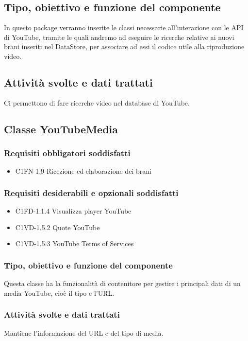 \subsection*{Tipo, obiettivo e funzione del componente}
In questo package verranno inserite le classi necessarie all'interazione con le
API di YouTube, tramite le quali andremo ad eseguire le ricerche relative ai
nuovi brani inseriti nel DataStore, per associare ad essi il codice utile alla
riproduzione video.
\subsection*{Attivit\`a svolte e dati trattati}
Ci permettono di fare ricerche video nel database di YouTube.

\subsection{Classe YouTubeMedia}
\subsubsection*{Requisiti obbligatori soddisfatti}
\begin{itemize}
    \item C1FN-1.9 Ricezione ed elaborazione dei brani
\end{itemize}
\subsubsection*{Requisiti desiderabili e opzionali soddisfatti}
\begin{itemize}
    \item C1FD-1.1.4 Visualizza player YouTube
    \item C1VD-1.5.2 Quote YouTube
    \item C1VD-1.5.3 YouTube Terms of Services
\end{itemize}
\subsubsection*{Tipo, obiettivo e funzione del componente}
Questa classe ha la funzionalit\`a di contenitore per gestire i principali
dati di un media YouTube, cio\`e il tipo e l'URL.
\subsubsection*{Attivit\`a svolte e dati trattati}
Mantiene l'informazione del URL e del tipo di media.

